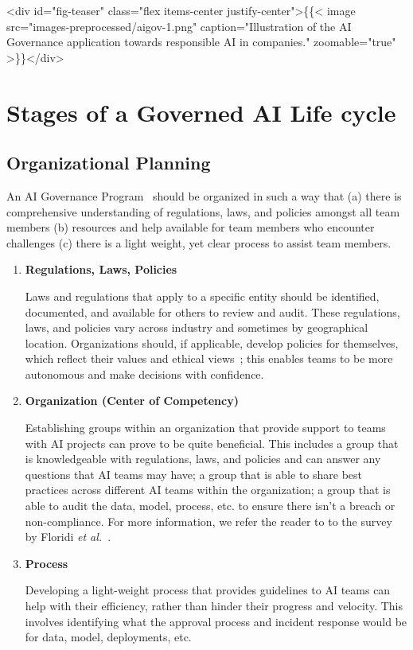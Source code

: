 \documentclass{article}
\begin{document}
<div id="fig-teaser" class="flex items-center justify-center">\{\{< image src="images-preprocessed/aigov-1.png" caption="Illustration of the AI Governance application towards responsible AI in companies." zoomable="true" >\}\}</div>



\section{Stages of a Governed AI Life cycle}

\subsection{Organizational Planning}

An AI Governance Program~\cite{kuziemski2020ai, dafoe2018ai, wang2018artificial} should be organized in such a way that (a) there is comprehensive understanding of regulations, laws, and policies amongst all team members (b) resources and help available for team members who encounter challenges (c) there is a light weight, yet clear process to assist team members.

\begin{enumerate}
\item \textbf{Regulations, Laws, Policies}

\smallskip Laws and regulations that apply to a specific entity should be identified, documented, and available for others to review and audit. These regulations, laws, and policies vary across industry and sometimes by geographical location. Organizations should, if applicable, develop policies for themselves, which reflect their values and ethical views~\cite{wang2018artificial, mittelstadt2019principles, floridi2018ai4people}; this enables teams to be more autonomous and make decisions with confidence.

\item \textbf{Organization (Center of Competency)}

\smallskip Establishing groups within an organization that provide support to teams with AI projects can prove to be quite beneficial. This includes a group that is knowledgeable with regulations, laws, and policies and can answer any questions that AI teams may have; a group that is able to share best practices across different AI teams within the organization; a group that is able to audit the data, model, process, etc. to ensure there isn't a breach or non-compliance. For more information, we refer the reader to to the survey by Floridi \emph{et al.}~\cite{floridi2018ai4people}.

\item \textbf{Process}

\smallskip Developing a light-weight process that provides guidelines to AI teams can help with their efficiency, rather than hinder their progress and velocity. This involves identifying what the approval process and incident response would be for data, model, deployments, etc.
\end{enumerate}
\end{document}
